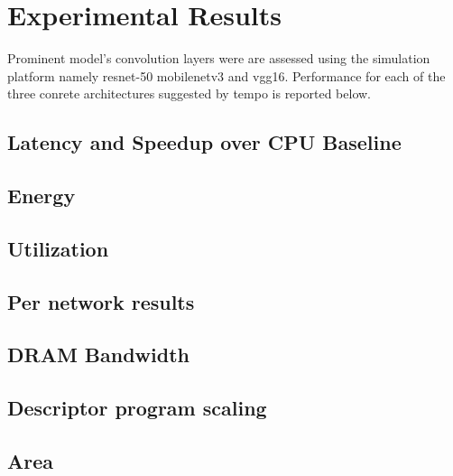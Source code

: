 \section{Experimental Results}
\label{chap:hero:sim_platform:cigar_side}

Prominent model's convolution layers were are assessed using the simulation platform  
namely resnet-50 mobilenetv3 and vgg16. Performance for each of the three conrete
architectures suggested by tempo is reported below.

\subsection{Latency and Speedup over CPU Baseline}
\label{chap:hero:sim_platform:cigar_side}

\subsection{Energy}
\label{chap:hero:sim_platform:cigar_side}

\subsection{Utilization}
\label{chap:hero:sim_platform:cigar_side}

\subsection{Per network results}
\label{chap:hero:sim_platform:cigar_side}

\subsection{DRAM Bandwidth}
\label{chap:hero:sim_platform:cigar_side}

\subsection{Descriptor program scaling}
\label{chap:hero:sim_platform:cigar_side}

\subsection{Area}
\label{chap:conv_gemm_equiv:overhead}

